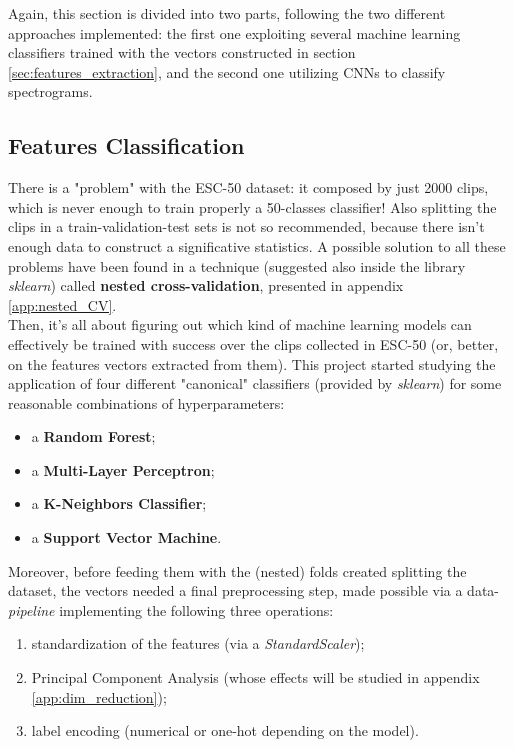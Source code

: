 Again, this section is divided into two parts, following the two different approaches implemented: the first one exploiting several machine learning classifiers trained with the vectors constructed in section \ref{sec:features_extraction}, and the second one utilizing CNNs to classify spectrograms. 

\subsection{Features Classification}
\label{sec:features_classification}
There is a "problem" with the ESC-50 dataset: it composed by just 2000 clips, which is never enough to train properly a 50-classes classifier! Also splitting the clips in a train-validation-test sets is not so recommended, because there isn't enough data to construct a significative statistics. A possible solution to all these problems have been found in a technique (suggested also inside the library \textit{sklearn}) called \textbf{nested cross-validation}, presented in appendix \ref{app:nested_CV}.\\
Then, it's all about figuring out which kind of machine learning models can effectively be trained with success over the clips collected in ESC-50 (or, better, on the features vectors extracted from them). This project started studying the application of four different "canonical" classifiers (provided by \textit{sklearn}) for some reasonable combinations of hyperparameters:
\begin{itemize}
	\itemsep0em
	\item a \textbf{Random Forest};
	\item a \textbf{Multi-Layer Perceptron};
	\item a \textbf{K-Neighbors Classifier};
	\item a \textbf{Support Vector Machine}.
\end{itemize}

Moreover, before feeding them with the (nested) folds created splitting the dataset, the vectors needed a final preprocessing step, made possible via a data-\textit{pipeline} implementing the following three operations:
\begin{enumerate}
	\item standardization of the features (via a \textit{StandardScaler});
	\item Principal Component Analysis (whose effects will be studied in appendix \ref{app:dim_reduction});
	\item label encoding (numerical or one-hot depending on the model).
\end{enumerate}

